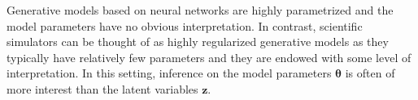 \documentclass[twocolumn,superscriptaddress,aps]{revtex4-1}
\newcommand{\bftheta}{{\bm \theta}}
\newcommand{\bfx}{\mathbf{x}}
\newcommand{\bfz}{\mathbf{z}}
\theoremstyle{plain}
\begin{document}

%



%
%

Generative models based on neural networks are highly parametrized and the model
parameters have no obvious interpretation. In contrast, scientific simulators
can be thought of as highly regularized generative models as they typically have
relatively few parameters and they are endowed with some level of
interpretation. In this setting, inference on the model parameters $\bftheta$ is
often of more interest than the latent variables $\bfz$.
\end{document}
